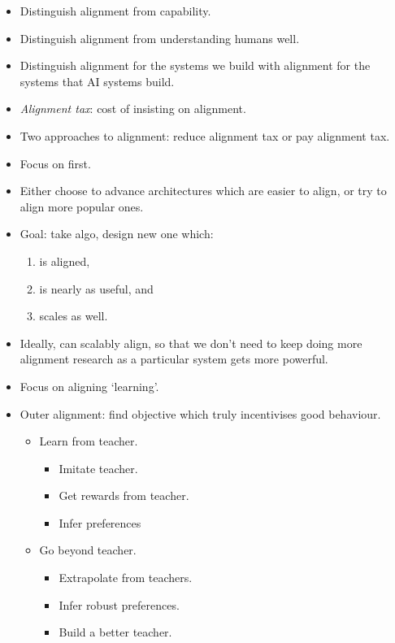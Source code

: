 \begin{itemize}
    \item Distinguish alignment from capability.
    \item Distinguish alignment from understanding humans well.
    \item Distinguish alignment for the systems we build with alignment for the systems that AI systems build.
    \item \emph{Alignment tax}: cost of insisting on alignment.
    \item Two approaches to alignment: reduce alignment tax or pay alignment tax.
    \item Focus on first.
    \item Either choose to advance architectures which are easier to align, or try to align more popular ones.
    \item Goal: take algo, design new one which:
    \begin{enumerate}[label=(\alph*)]
        \item is aligned,
        \item is nearly as useful, and
        \item scales as well.
    \end{enumerate}
    \item Ideally, can scalably align, so that we don't need to keep doing more alignment research as a particular system gets more powerful.
    \item Focus on aligning `learning'.
    \item Outer alignment: find objective which truly incentivises good behaviour.
    \begin{itemize}
        \item Learn from teacher.
        \begin{itemize}
            \item Imitate teacher.
            \item Get rewards from teacher.
            \item Infer preferences
        \end{itemize}
        \item Go beyond teacher.
        \begin{itemize}
            \item Extrapolate from teachers.
            \item Infer robust preferences.
            \item Build a better teacher.
        \end{itemize}

\end{itemize}
\end{itemize}
